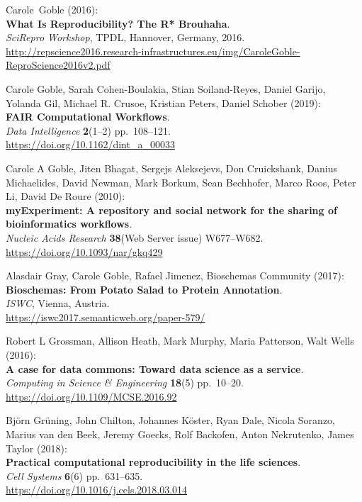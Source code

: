 \begin{thebibliography}{9}
Carole~Goble (2016):\\
\textbf{What Is Reproducibility? The R* Brouhaha}.\\
\emph{SciRepro Workshop}, TPDL, Hannover, Germany, 2016.
\url{http://repscience2016.research-infrastructures.eu/img/CaroleGoble-ReproScience2016v2.pdf}

Carole Goble, Sarah Cohen-Boulakia, Stian Soiland-Reyes, Daniel
Garijo, Yolanda Gil, Michael R. Crusoe, Kristian Peters, Daniel Schober
(2019):\\
\textbf{FAIR Computational Workflows}.\\
\emph{Data Intelligence} \textbf{2}(1--2) pp.~108--121.\\
\url{https://doi.org/10.1162/dint_a_00033}

Carole A Goble, Jiten Bhagat, Sergejs Aleksejevs, Don
Cruickshank, Danius Michaelides, David Newman, Mark Borkum, Sean
Bechhofer, Marco Roos, Peter Li, David De Roure (2010):\\
\textbf{myExperiment: A repository and social network for the sharing of
bioinformatics workflows}.\\
\emph{Nucleic Acids Research} \textbf{38}(Web Server issue)
W677--W682.\\
\url{https://doi.org/10.1093/nar/gkq429}

Alasdair Gray, Carole Goble, Rafael Jimenez, Bioschemas
Community (2017):\\
\textbf{Bioschemas: From Potato Salad to Protein Annotation}.\\
\emph{ISWC}, Vienna, Austria.\\
\url{https://iswc2017.semanticweb.org/paper-579/}

Robert L Grossman, Allison Heath, Mark Murphy, Maria Patterson,
Walt Wells (2016):\\
\textbf{A case for data commons: Toward data science as a service}.\\
\emph{Computing in Science \& Engineering} \textbf{18}(5) pp.~10--20.\\
\url{https://doi.org/10.1109/MCSE.2016.92}

Björn Grüning, John Chilton, Johannes Köster, Ryan Dale, Nicola
Soranzo, Marius van den Beek, Jeremy Goecks, Rolf Backofen, Anton
Nekrutenko, James Taylor (2018):\\
\textbf{Practical computational reproducibility in the life sciences}.\\
\emph{Cell Systems} \textbf{6}(6) pp.~631--635.\\
\url{https://doi.org/10.1016/j.cels.2018.03.014}


\end{thebibliography}
